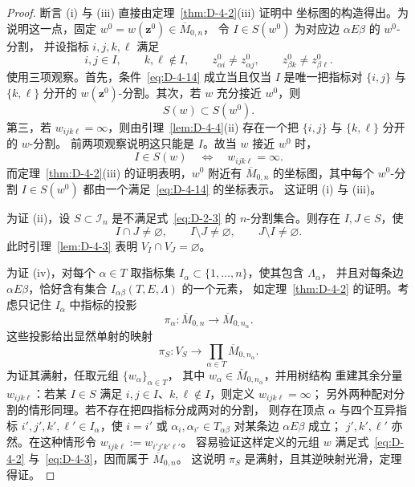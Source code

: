 \begin{proof}
断言 (i) 与 (iii) 直接由定理~\ref{thm:D-4-2}(iii) 证明中
坐标图的构造得出。为说明这一点，固定
$w^0=w(\mathbf z^0)\in\overline M_{0,n}$，
令 $I\in S(w^0)$ 为对应边 $\alpha E\beta$ 的 $w^0$-分割，
并设指标 $i,j,k,\ell$ 满足
\begin{equation}\label{eq:D-4-14}
  i,j\in I,\qquad k,\ell\notin I,\qquad
  z^0_{\alpha i}\ne z^0_{\alpha j},\qquad
  z^0_{\beta k}\ne z^0_{\beta\ell}.
\end{equation}
使用三项观察。首先，条件~\eqref{eq:D-4-14} 成立当且仅当
$I$ 是唯一把指标对 $\{i,j\}$ 与 $\{k,\ell\}$ 分开的
$w(\mathbf z^0)$-分割。其次，若 $w$ 充分接近 $w^0$，则
\[
  S(w)\subset S(w^0).
\]
第三，若 $w_{ijk\ell}=\infty$，则由引理~\ref{lem:D-4-4}(ii)
存在一个把 $\{i,j\}$ 与 $\{k,\ell\}$ 分开的 $w$-分割。
前两项观察说明这只能是 $I$。故当 $w$ 接近 $w^0$ 时，
\begin{equation}\label{eq:D-4-15}
  I\in S(w)\quad\Longleftrightarrow\quad w_{ijk\ell}=\infty.
\end{equation}
而定理~\ref{thm:D-4-2}(iii) 的证明表明，$w^0$ 附近有
$\overline M_{0,n}$ 的坐标图，其中每个 $w^0$-分割
$I\in S(w^0)$ 都由一个满足~\eqref{eq:D-4-14} 的坐标表示。
这证明 (i) 与 (iii)。

为证 (ii)，设 $S\subset\mathcal I_n$ 是不满足式~\eqref{eq:D-2-3}
的 $n$-分割集合。则存在 $I,J\in S$，使
\[
  I\cap J\ne\varnothing,\qquad I\setminus J\ne\varnothing,
  \qquad J\setminus I\ne\varnothing.
\]
此时引理~\ref{lem:D-4-3} 表明 $V_I\cap V_J=\varnothing$。

为证 (iv)，对每个 $\alpha\in T$ 取指标集
$I_\alpha\subset\{1,\ldots,n\}$，使其包含 $\Lambda_\alpha$，
并且对每条边 $\alpha E\beta$，恰好含有集合
$I_{\alpha\beta}(T,E,\Lambda)$ 的一个元素，
如定理~\ref{thm:D-4-2} 的证明。考虑只记住 $I_\alpha$ 中指标的投影
\[
  \pi_\alpha:\overline M_{0,n}\longrightarrow
  \overline M_{0,n_\alpha}.
\]
这些投影给出显然单射的映射
\[
  \pi_S:V_S\longrightarrow
  \prod_{\alpha\in T}\overline M_{0,n_\alpha}.
\]
为证其满射，任取元组 $\{w_\alpha\}_{\alpha\in T}$，
其中 $w_\alpha\in\overline M_{0,n_\alpha}$，并用树结构
重建其余分量 $w_{ijk\ell}$：若某 $I\in S$ 满足
$i,j\in I$、$k,\ell\notin I$，则定义 $w_{ijk\ell}=\infty$；
另外两种配对分割的情形同理。若不存在把四指标分成两对的分割，
则存在顶点 $\alpha$ 与四个互异指标
  $i',j',k',\ell'\in I_\alpha$，使 $i=i'$ 或
$\alpha_i,\alpha_{i'}\in T_{\alpha\beta}$ 对某条边 $\alpha E\beta$ 成立；
$j',k',\ell'$ 亦然。在这种情形令
$w_{ijk\ell}:=w_{i'j'k'\ell'}$。
容易验证这样定义的元组 $w$ 满足式~\eqref{eq:D-4-2}
与~\eqref{eq:D-4-3}，因而属于 $\overline M_{0,n}$。
这说明 $\pi_S$ 是满射，且其逆映射光滑，定理得证。
\end{proof}
